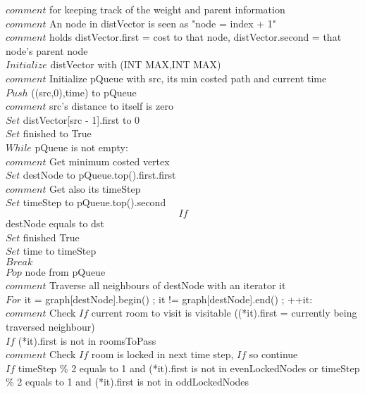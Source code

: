 \documentclass[10pt]{article}
\begin{document}
	$comment$ for keeping track of the weight and parent information \\
	$comment$ An node in distVector is seen as "node = index + 1"  \\
	$comment$ holds distVector.first = cost to that node, distVector.second = that node's parent node \\
	$Initialize$ distVector with (INT MAX,INT MAX) \\
 
	$comment$ Initialize pQueue with src, its min costed path and current time \\
	$Push$ ((src,0),time) to pQueue \\

	$comment$ src's distance to itself is zero \\
	$Set$ distVector[src - 1].first to 0 \\

	$Set$ finished to True \\

	$While$ pQueue is not empty: \\

		$comment$ Get minimum costed vertex \\
		$Set$ destNode to pQueue.top().first.first \\
		$comment$ Get also its timeStep \\
		$Set$ timeStep to pQueue.top().second \\

		$$If$$ destNode equals to dst \\

			$Set$ finished True \\
			$Set$ time to timeStep \\
			$Break$ \\

		$Pop$ node from pQueue \\

		$comment$ Traverse all neighbours of destNode with an iterator it \\
		$For$ it = graph[destNode].begin() ; it != graph[destNode].end() ; ++it: \\

			$comment$ Check $If$ current room to visit is visitable ((*it).first = currently being traversed neighbour)  \\
			$If$ (*it).first is not in roomsToPass \\

				$comment$ Check $If$ room is locked in next time step, $If$ so continue \\
				$If$ timeStep \% 2 equals to 1 and (*it).first is not in evenLockedNodes or timeStep \% 2 equals to 1 and (*it).first is not in oddLockedNodes \\
\end{document}
